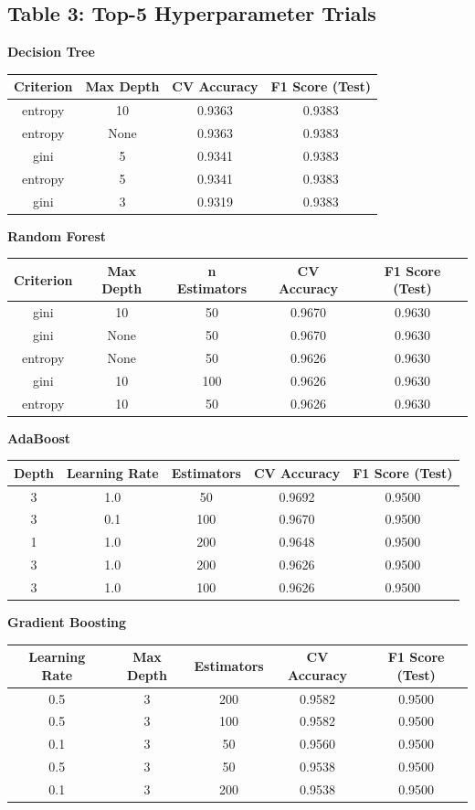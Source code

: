 \documentclass[12pt,a4paper]{article}
\begin{document}
\clearpage



\subsection*{Table 3: Top-5 Hyperparameter Trials}



\textbf{Decision Tree}
\begin{longtable}{|c|c|c|c|}
\hline
Criterion & Max Depth & CV Accuracy & F1 Score (Test) \\ \hline
entropy & 10 & 0.9363 & 0.9383 \\
entropy & None & 0.9363 & 0.9383 \\
gini & 5 & 0.9341 & 0.9383 \\
entropy & 5 & 0.9341 & 0.9383 \\
gini & 3 & 0.9319 & 0.9383 \\
\hline
\end{longtable}

\textbf{Random Forest}
\begin{longtable}{|c|c|c|c|c|}
\hline
Criterion & Max Depth & n Estimators & CV Accuracy & F1 Score (Test) \\ \hline
gini & 10 & 50 & 0.9670 & 0.9630 \\
gini & None & 50 & 0.9670 & 0.9630 \\
entropy & None & 50 & 0.9626 & 0.9630 \\
gini & 10 & 100 & 0.9626 & 0.9630 \\
entropy & 10 & 50 & 0.9626 & 0.9630 \\
\hline
\end{longtable}

\textbf{AdaBoost}
\begin{longtable}{|c|c|c|c|c|}
\hline
Depth & Learning Rate & Estimators & CV Accuracy & F1 Score (Test) \\ \hline
3 & 1.0 & 50 & 0.9692 & 0.9500 \\
3 & 0.1 & 100 & 0.9670 & 0.9500 \\
1 & 1.0 & 200 & 0.9648 & 0.9500 \\
3 & 1.0 & 200 & 0.9626 & 0.9500 \\
3 & 1.0 & 100 & 0.9626 & 0.9500 \\
\hline
\end{longtable}

\textbf{Gradient Boosting}
\begin{longtable}{|c|c|c|c|c|}
\hline
Learning Rate & Max Depth & Estimators & CV Accuracy & F1 Score (Test) \\ \hline
0.5 & 3 & 200 & 0.9582 & 0.9500 \\
0.5 & 3 & 100 & 0.9582 & 0.9500 \\
0.1 & 3 & 50 & 0.9560 & 0.9500 \\
0.5 & 3 & 50 & 0.9538 & 0.9500 \\
0.1 & 3 & 200 & 0.9538 & 0.9500 \\
\hline
\end{longtable}
\end{document}
